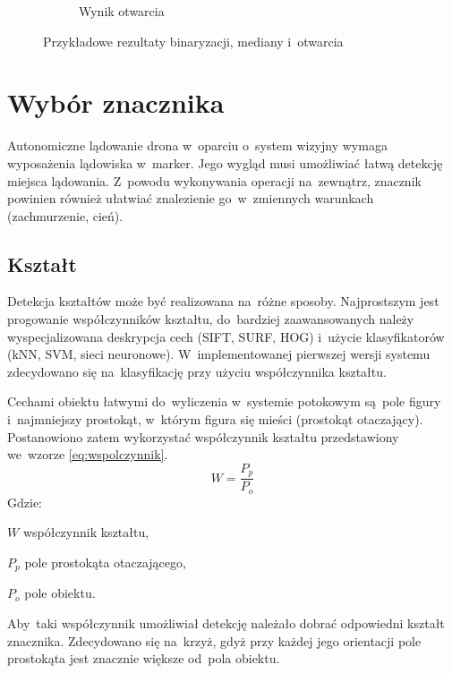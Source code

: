 \begin{figure}
\begin{subfigure}{0.7\textwidth}
		\caption{Wynik otwarcia}
		\label{fig:opened_1}
	\end{subfigure}
	\caption{Przykładowe rezultaty binaryzacji, mediany i~otwarcia}
	\label{fig:operacje}
\end{figure}



\section{Wybór znacznika} 
\label{sec:wybor_znacznika}

Autonomiczne lądowanie drona w~oparciu o~system wizyjny wymaga wyposażenia lądowiska w~marker. 
Jego wygląd musi umożliwiać łatwą detekcję miejsca lądowania. 
Z~powodu wykonywania operacji na~zewnątrz, znacznik powinien również ułatwiać znalezienie go~w~zmiennych warunkach (zachmurzenie, cień).

\subsection{Kształt}
\label{subsec:ksztalt} 
Detekcja kształtów może być realizowana na~różne sposoby. 
Najprostszym jest progowanie współczynników kształtu, do~bardziej zaawansowanych należy wyspecjalizowana deskrypcja cech (SIFT, SURF, HOG) i~użycie klasyfikatorów (kNN, SVM, sieci neuronowe). %
W~implementowanej pierwszej wersji systemu zdecydowano się na~klasyfikację przy użyciu współczynnika kształtu.

Cechami obiektu łatwymi do~wyliczenia w~systemie potokowym są~pole figury i~najmniejszy prostokąt, w~którym figura się mieści (prostokąt otaczający). 
Postanowiono zatem wykorzystać współczynnik kształtu przedstawiony we~wzorze \ref{eq:wspolczynnik}.\\
\begin{equation} \label{eq:wspolczynnik}
W=\frac{P_p}{P_o}
\end{equation}
Gdzie:
\begin{eqwhere}[2cm]
	\item[$W$] współczynnik kształtu,
	\item[$P_p$] pole prostokąta otaczającego,
	\item[$P_o$] pole obiektu.
\end{eqwhere}
Aby~taki współczynnik umożliwiał detekcję należało dobrać odpowiedni kształt znacznika. 
Zdecydowano się na~krzyż, gdyż przy każdej jego orientacji pole prostokąta jest znacznie większe od~pola obiektu.

